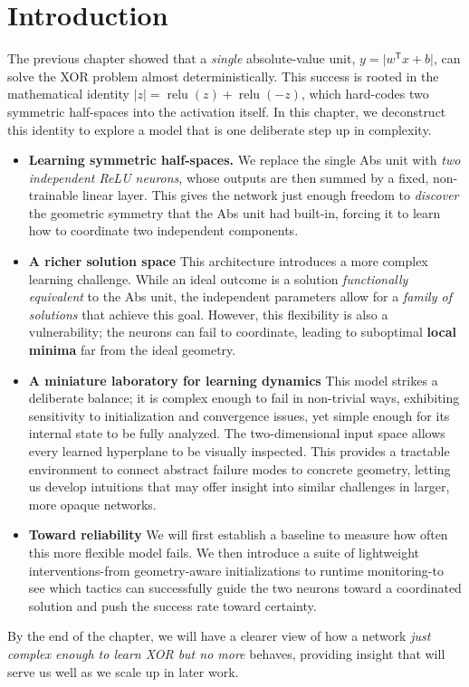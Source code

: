 \section{Introduction}
\label{sec:relu1-introduction}

The previous chapter showed that a \emph{single} absolute-value unit, \(y=\lvert w^{\mathsf T} x + b\rvert\), can solve the XOR problem almost deterministically. This success is rooted in the mathematical identity \(\lvert z\rvert=\operatorname{relu}(z)+\operatorname{relu}(-z)\), which hard-codes two symmetric half-spaces into the activation itself. In this chapter, we deconstruct this identity to explore a model that is one deliberate step up in complexity.

\begin{itemize}
    \item \textbf{Learning symmetric half-spaces.}
        We replace the single Abs unit with \emph{two independent ReLU neurons}, whose outputs are then summed by a fixed, non-trainable linear layer. This gives the network just enough freedom to \emph{discover} the geometric symmetry that the Abs unit had built-in, forcing it to learn how to coordinate two independent components.

    \item \textbf{A richer solution space}
        This architecture introduces a more complex learning challenge. While an ideal outcome is a solution \emph{functionally equivalent} to the Abs unit, the independent parameters allow for a \emph{family of solutions} that achieve this goal. However, this flexibility is also a vulnerability; the neurons can fail to coordinate, leading to suboptimal \textbf{local minima} far from the ideal geometry.

    \item \textbf{A miniature laboratory for learning dynamics}
        This model strikes a deliberate balance; it is complex enough to fail in non-trivial ways, exhibiting sensitivity to initialization and convergence issues, yet simple enough for its internal state to be fully analyzed. The two-dimensional input space allows every learned hyperplane to be visually inspected. This provides a tractable environment to connect abstract failure modes to concrete geometry, letting us develop intuitions that may offer insight into similar challenges in larger, more opaque networks.
    \item \textbf{Toward reliability}
        We will first establish a baseline to measure how often this more flexible model fails. We then introduce a suite of lightweight interventions-from geometry-aware initializations to runtime monitoring-to see which tactics can successfully guide the two neurons toward a coordinated solution and push the success rate toward certainty.
\end{itemize}

By the end of the chapter, we will have a clearer view of how a network \emph{just complex enough to learn XOR but no more} behaves, providing insight that will serve us well as we scale up in later work.